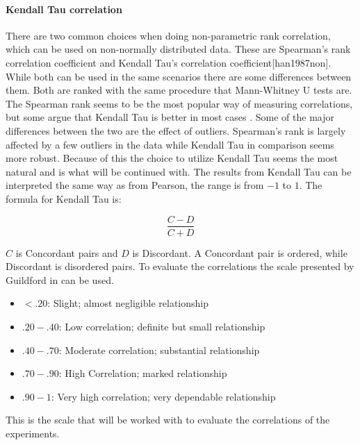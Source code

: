 \paragraph{Kendall Tau correlation}
There are two common choices when doing non-parametric rank correlation, which can be used on non-normally distributed data. These are Spearman's rank correlation coefficient and Kendall Tau's correlation coefficient[han1987non]. While both can be used in the same scenarios there are some differences between them. Both are ranked with the same procedure that Mann-Whitney U tests are. The Spearman rank seems to be the most popular way of measuring correlations, but some argue that Kendall Tau is better in most cases \cite{gilpin1993table}. Some of the major differences between the two are the effect of outliers. Spearman's rank is largely affected by a few outliers in the data while Kendall Tau in comparison seems more robust. Because of this the choice to utilize Kendall Tau seems the most natural and is what will be continued with. The results from Kendall Tau can be interpreted the same way as from Pearson, the range is from $-1$ to $1$. The formula for Kendall Tau is:

\begin{equation}
    \frac{C-D}{C+D}
\end{equation}

$C$ is Concordant pairs and $D$ is Discordant. A Concordant pair is ordered, while Discordant is disordered pairs\cite{kendall1938new}. To evaluate the correlations the scale presented by Guildford in \cite[219]{guilford1950fundamental} can be used.
\begin{itemize}
    \item $<.20$: Slight; almost negligible relationship
    \item $.20-.40$: Low correlation; definite but small relationship
    \item $.40-.70$: Moderate correlation; substantial relationship
    \item $.70-.90$: High Correlation; marked relationship
    \item $.90-1$: Very high correlation; very dependable relationship
\end{itemize}


This is the scale that will be worked with to evaluate the correlations of the experiments.

